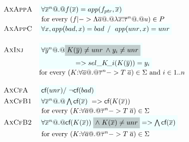 \documentclass[preprint,nocopyrightspace,draft]{sigplanconf}
\begin{document}
{\[\begin{array}{c}
\begin{array}{lll}
 \textsc{AxAppA}  & \formula{\forall \oln{x}{n} @.@ f(\ol{x}) = app(f_{ptr},\xs)} \\
                  & \text{ for every } (f |-> \Lambda\as @.@ \lambda\oln{x{:}\tau}{n} @.@ u) \in P \\
 \textsc{AxAppC}  & \formula{\forall x, app(\bad,x) = \bad \; /\ \; app(\unr,x) = \unr}    \\ \\
 \textsc{AxInj}   & \formula{\forall \oln{y}{n} @.@ \highlight{K(\ys) \neq \unr\;\land\; y_i \neq \unr}} \\ 
                  & \formula{\quad\qquad\qquad => \sel{K}{i}(K(\ys)) = y_i} \\ 
                  & \text{for every } (K{:}\forall\as @.@ \oln{\tau}{n} -> T\;\as) \in \Sigma \text{ and } i \in 1..n \\ \\
 \textsc{AxCfA}   & \formula{\lcf{\unr} /\ \lncf{\bad}} \\
 \textsc{AxCfB1}  & \formula{\forall \oln{x}{n} @.@ \bigwedge\lcf{\ol{x}}} => \lcf{K(\ol{x})} \\
                  & \text{ for every } (K{:}\forall\as @.@ \oln{\tau}{n} -> T\;\as) \in \Sigma \\ 
 \textsc{AxCfB2}  & \formula{\forall \oln{x}{n} @.@ \lcf{K(\ol{x})}\;\highlight{\land\;K(\ol{x}) \neq \unr} => \bigwedge\lcf{\ol{x}}} \\
                  & \text{ for every } (K{:}\forall\as @.@ \oln{\tau}{n} -> T\;\as) \in \Sigma
\end{array}
\end{array}\]}
\end{document}
